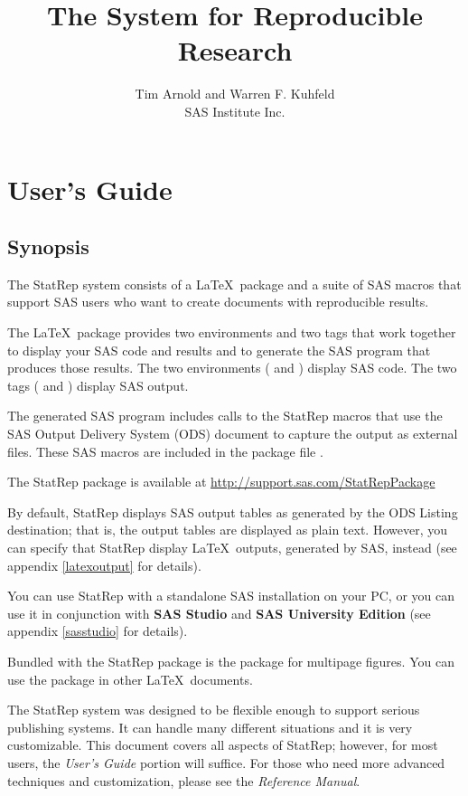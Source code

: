 \documentclass[article,oneside]{memoir}
\title{The \StatRep System for Reproducible Research}
\author{Tim Arnold and Warren F. Kuhfeld\\SAS Institute Inc.}
\newcommand*{\StatRep}{\textsf{StatRep}\xspace}
\begin{document}
\maketitle
\tableofcontents*%
\part{User's Guide}
\chapter{Synopsis}
The \StatRep system consists of a \LaTeX\ package and a suite of SAS macros that
support SAS users who want to create documents with reproducible results.

The \LaTeX\ package provides two environments and
two tags that work together to display your SAS code and results and to
generate the SAS program that produces those results. The two environments
( and ) display SAS code.
The two tags ( and ) display SAS output.

The generated SAS program includes calls to the \StatRep macros that use the SAS
Output Delivery System (ODS) document to capture the output as external files.
These SAS macros are included in the package file .

The \StatRep package is available at \url{http://support.sas.com/StatRepPackage}

By default, \StatRep displays SAS output tables as generated by the ODS Listing
destination; that is, the output tables are displayed as plain text. However, you can
specify that \StatRep display \LaTeX\ outputs, generated by SAS, instead
(see appendix \ref{latexoutput} for details).

You can use \StatRep with a standalone SAS installation on your PC, or you can use it
in conjunction with \textbf{SAS Studio} and \textbf{SAS University Edition}
(see appendix \ref{sasstudio} for details).

Bundled with the \StatRep package is the  package for
multipage figures.
You can use the  package in other \LaTeX\ documents.

The \StatRep system was designed to be flexible enough to support serious publishing systems.
It can handle many different situations and it is very customizable.
This document
covers all aspects of \StatRep; however, for most users, the \textit{User's Guide} portion
will suffice. For those who need more advanced techniques and customization, please see the
\textit{Reference Manual}.
\end{document}
